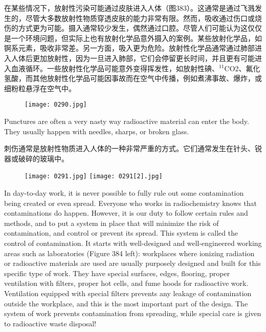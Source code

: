 \documentclass[dvipsnames, svgnames,a4paper,11pt]{article}
\begin{document}
在某些情况下，放射性污染可能通过皮肤进入人体（图383）。这通常是通过飞溅发生的，尽管大多数放射性物质穿透皮肤的能力非常有限。然而，吸收通过伤口或烧伤的方式更为可能。摄入通常较少发生，偶然通过口腔。尽管人们可能认为这仅仅是一个环境问题，但实际上也有放射化学品意外摄入的案例。某些放射化学品，如锕系元素，吸收非常差。另一方面，吸入更为危险。放射性化学品通常通过肺部进入人体后更加放射性，因为一旦进入肺部，它们会停留更长时间，并且更有可能进入血液循环。一些放射性化学品可能意外变得挥发性，如放射性碘、\(\mathrm{^{11}C}\)O2、氟化氢酸，而其他放射性化学品可能因事故而在空气中传播，例如煮沸事故、爆炸，或细粉粒悬浮在空气中。

\begin{figure}[h]
    \centering
    \texttt{[image: 0290.jpg]} 
     \label{fig383}
\end{figure}


Punctures are often a very nasty way radioactive material can enter the body. They usually happen with needles, sharps, or broken glass.

刺伤通常是放射性物质进入人体的一种非常严重的方式。它们通常发生在针头、锐器或破碎的玻璃中。

\begin{figure}[h]
    \centering
    \texttt{[image: 0291.jpg]} \hspace{0.2in}
    \texttt{[image: 0291[2].jpg]}  
     \label{fig384}
\end{figure}

In day-to-day work, it is never possible to fully rule out some contamination being created or even spread. Everyone who works in radiochemistry knows that contaminations do happen. However, it is our duty to follow certain rules and methods, and to put a system in place that will minimize the risk of contamination, and control or prevent its spread. This system is called the control of contamination. It starts with well-designed and well-engineered working areas such as laboratories (Figure 384 left): workplaces where ionizing radiation or radioactive materials are used are usually purposely designed and built for this specific type of work. They have special surfaces, edges, flooring, proper ventilation with filters, proper hot cells, and fume hoods for radioactive work. Ventilation equipped with special filters prevents any leakage of contamination outside the workplace, and this is the most important part of the design. The system of work prevents contamination from spreading, while special care is given to radioactive waste disposal!
\end{document}
